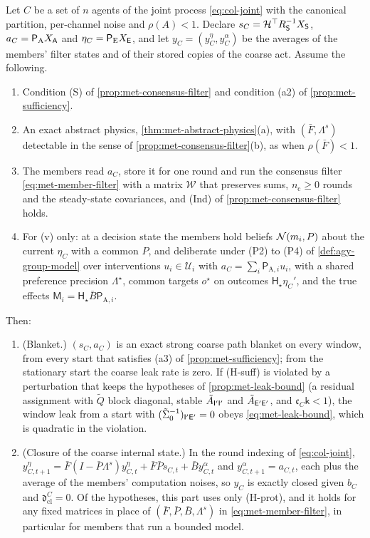 \begin{theorem}\label{thm:met-h5a}
Let $C$ be a set of $n$ agents of the joint process \eqref{eq:col-joint} with the canonical partition, per-channel noise and $\rho(A)<1$. Declare $s_C=\mathcal H^\top R_{\mathsf{S}}^{-1}X_{\mathsf{S}}$, $a_C=\mathsf P_{\mathrm A}X_{\mathsf{A}}$ and $\eta_C=\mathsf P_{\mathrm E}X_{\mathsf{E}}$, and let $y_C=(y^\eta_C,y^\alpha_C)$ be the averages of the members' filter states and of their stored copies of the coarse act. Assume the following.
\begin{enumerate}
\item[(H-suff)] Condition (S) of \cref{prop:met-consensus-filter} and condition (a2) of \cref{prop:met-sufficiency}.
\item[(H-phys)] An exact abstract physics, \cref{thm:met-abstract-physics}(a), with $(\bar F,\Lambda^s)$ detectable in the sense of \cref{prop:met-consensus-filter}(b), as when $\rho(\bar F)<1$.
\item[(H-prot)] The members read $a_C$, store it for one round and run the consensus filter \eqref{eq:met-member-filter} with a matrix $\mathcal W$ that preserves sums, $n_{\mathrm c}\ge0$ rounds and the steady-state covariances, and (Ind) of \cref{prop:met-consensus-filter} holds.
\item[(H-act)] For (v) only: at a decision state the members hold beliefs $\mathcal{N}(m_i,P)$ about the current $\eta_C$ with a common $P$, and deliberate under (P2) to (P4) of \cref{def:agy-group-model} over interventions $u_i\in\mathcal U_i$ with $a_C=\sum_i\mathsf P_{\mathrm A,i}u_i$, with a shared preference precision $\Lambda^\star$, common targets $o^\star$ on outcomes $\mathsf H_\star\eta_C'$, and the true effects $\mathsf M_i=\mathsf H_\star\bar B\mathsf P_{\mathrm A,i}$.
\end{enumerate}
Then:
\begin{enumerate}
\item[(i)] (Blanket.) $(s_C,a_C)$ is an exact strong coarse path blanket on every window, from every start that satisfies (a3) of \cref{prop:met-sufficiency}; from the stationary start the coarse leak rate is zero. If (H-suff) is violated by a perturbation that keeps the hypotheses of \cref{prop:met-leak-bound} (a residual assignment with $\tilde Q$ block diagonal, stable $\tilde A_{\mathsf{I}'\mathsf{I}'}$ and $\tilde A_{\mathsf{E}'\mathsf{E}'}$, and $\mathfrak c_C\mathsf k<1$), the window leak from a start with $(\tilde\Sigma_0^{-1})_{\mathsf{I}'\mathsf{E}'}=0$ obeys \eqref{eq:met-leak-bound}, which is quadratic in the violation.
\item[(ii)] (Closure of the coarse internal state.) In the round indexing of \eqref{eq:col-joint}, $y^\eta_{C,t+1}=\bar F(I-\bar P\Lambda^s)y^\eta_{C,t}+\bar F\bar Ps_{C,t}+\bar By^\alpha_{C,t}$ and $y^\alpha_{C,t+1}=a_{C,t}$, each plus the average of the members' computation noises, so $y_C$ is exactly closed given $b_C$ and $\mathfrak d^C_{\mathrm{cl}}=0$. Of the hypotheses, this part uses only (H-prot), and it holds for any fixed matrices in place of $(\bar F,\bar P,\bar B,\Lambda^s)$ in \eqref{eq:met-member-filter}, in particular for members that run a bounded model.

\end{enumerate}
\end{theorem}

